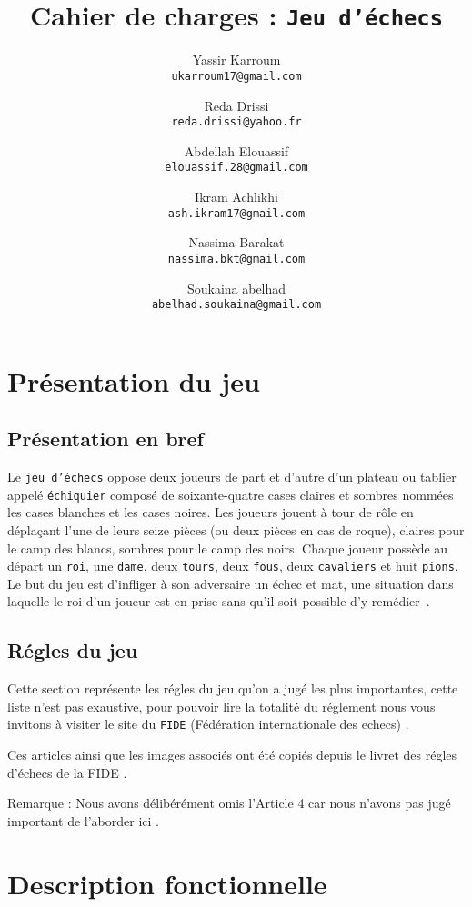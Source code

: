 \documentclass{article}
\author{
    Yassir Karroum\\
    \texttt{ukarroum17@gmail.com}
    \and
    Reda Drissi\\
    \texttt{reda.drissi@yahoo.fr}
    \and
    Abdellah Elouassif\\
    \texttt{elouassif.28@gmail.com}
    \and
    Ikram Achlikhi\\
    \texttt{ash.ikram17@gmail.com}
    \and
    Nassima Barakat\\
    \texttt{nassima.bkt@gmail.com}
    \and
    Soukaina abelhad\\
    \texttt{abelhad.soukaina@gmail.com}
}
\title{Cahier de charges : \texttt{Jeu d'échecs}}
\begin{document}
\maketitle

\newpage

\tableofcontents

\newpage

\section{Présentation du jeu}

\subsection{Présentation en bref}

Le \texttt{jeu d’échecs} oppose deux joueurs de part et d’autre d’un plateau ou tablier appelé \texttt{échiquier} composé de soixante-quatre cases claires et sombres nommées les cases blanches et les cases noires. Les joueurs jouent à tour de rôle en déplaçant l'une de leurs seize pièces (ou deux pièces en cas de roque), claires pour le camp des blancs, sombres pour le camp des noirs. Chaque joueur possède au départ un \texttt{roi}, une \texttt{dame}, deux \texttt{tours}, deux \texttt{fous}, deux \texttt{cavaliers} et huit \texttt{pions}. Le but du jeu est d'infliger à son adversaire un échec et mat, une situation dans laquelle le roi d'un joueur est en prise sans qu'il soit possible d'y remédier \cite{wikiEchecs}.

\subsection{Régles du jeu}

Cette section représente les régles du jeu qu'on a jugé les plus importantes, cette liste n'est pas exaustive, pour pouvoir lire la totalité du réglement nous vous invitons à visiter le site du \texttt{FIDE} (Fédération internationale des echecs) \cite{fide}.

Ces articles ainsi que les images associés ont été copiés depuis le livret des régles d'échecs de la FIDE \cite{livreFide}.

Remarque : Nous avons délibérément omis l'Article 4 car nous n'avons pas jugé important de l'aborder ici .




\section{Description fonctionnelle}
\end{document}
